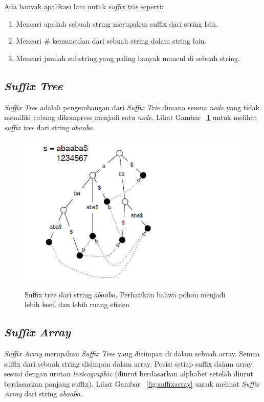 Ada banyak apalikasi lain untuk \textit{suffix trie} seperti:
\begin{enumerate}
	\item Mencari apakah sebuah string merupakan suffix dari string lain.
	\item Mencari \# kemunculan dari sebuah string dalam string lain.
	\item Mencari jumlah substring yang paling banyak muncul di sebuah string.
\end{enumerate}

\subsection{\textit{Suffix Tree}}

\textit{Suffix Tree} adalah pengembangan dari \textit{Suffix Trie} dimana semua \textit{node} yang tidak memiliki cabang dikompress menjadi satu \textit{node}. Lihat Gambar ~\ref{fig:suffixtree} untuk melihat \textit{suffix tree} dari string $abaaba$.

	\begin{figure}
		\includegraphics[width=\textwidth,keepaspectratio]{fig/suffixtree.png}%
		\caption{Suffix tree dari string $abaaba$. Perhatikan bahwa pohon menjadi lebih kecil dan lebih ruang efisien}%
		\label{fig:suffixtree}%
	\end{figure}
	
\subsection{\textit{Suffix Array}}

\textit{Suffix Array} merupakan \textit{Suffix Tree} yang disimpan di dalam sebuah array. Semua suffix dari sebuah string disimpan dalam array. Posisi setiap suffix dalam array sesuai dengan urutan \textit{lexicographic} (diurut berdasarkan alphabet setelah diurut berdasarkan panjang suffix). Lihat Gambar ~\ref{fig:suffixarray} untuk melihat \textit{Suffix Array} dari string $abaaba$.

